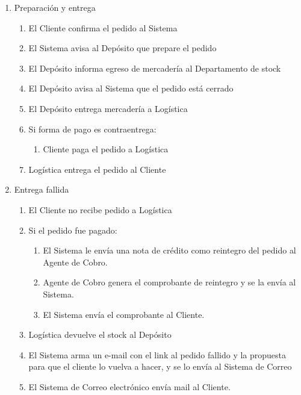 \begin{enumerate}
 \item Preparación y entrega
  \begin{enumerate}
    \item El Cliente confirma el pedido al Sistema
    \item El Sistema avisa al Depósito que prepare el pedido 
    \item El Depósito informa egreso de mercadería al Departamento de stock
    \item El Depósito avisa al Sistema que el pedido está cerrado
    \item El Depósito entrega mercadería a Logística
    \item Si forma de pago es contraentrega: 
    \begin{enumerate}
      \item Cliente paga el pedido a Logística
    \end{enumerate}
    \item Logística entrega el pedido al Cliente
  \end{enumerate}

 \item Entrega fallida
  \begin{enumerate}
    \item El Cliente no recibe pedido a Logística
    \item Si el pedido fue pagado:
    \begin{enumerate}
      \item El Sistema le env\'ia una nota de cr\'edito como reintegro del pedido al Agente de Cobro. 
      \item Agente de Cobro genera el comprobante de reintegro y se la env\'ia al Sistema.
      \item El Sistema env\'ia el comprobante al Cliente. 
    \end{enumerate}

    \item Logística devuelve el stock al Depósito
    \item El Sistema arma un e-mail con el link al pedido fallido y la propuesta para que el cliente lo vuelva a hacer, y se lo env\'ia al Sistema de Correo
    \item El Sistema de Correo electrónico env\'ia mail al Cliente.
  \end{enumerate}


\end{enumerate}
